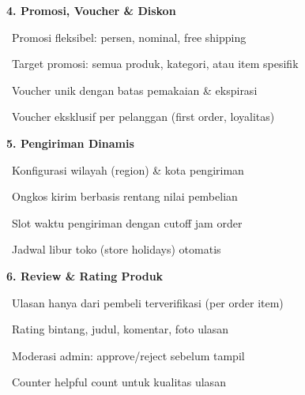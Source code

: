 \documentclass[a4paper]{article}
\begin{document}
\hfill%
\begin{minipage}[t]{0.485\textwidth}

    {\fontsize{10.5}{13}\selectfont\bfseries\color{EmeraldPrimary} 4. Promosi, Voucher \& Diskon}
    \vspace{3pt}

    {\fontsize{9}{13}\selectfont\color{TextDark}%
    \textbullet\ Promosi fleksibel: persen, nominal, free shipping\par\vspace{2pt}%
    \textbullet\ Target promosi: semua produk, kategori, atau item spesifik\par\vspace{2pt}%
    \textbullet\ Voucher unik dengan batas pemakaian \& ekspirasi\par\vspace{2pt}%
    \textbullet\ Voucher eksklusif per pelanggan (first order, loyalitas)}%
    \vspace{8pt}

    {\fontsize{10.5}{13}\selectfont\bfseries\color{EmeraldPrimary} 5. Pengiriman Dinamis}
    \vspace{3pt}

    {\fontsize{9}{13}\selectfont\color{TextDark}%
    \textbullet\ Konfigurasi wilayah (region) \& kota pengiriman\par\vspace{2pt}%
    \textbullet\ Ongkos kirim berbasis rentang nilai pembelian\par\vspace{2pt}%
    \textbullet\ Slot waktu pengiriman dengan cutoff jam order\par\vspace{2pt}%
    \textbullet\ Jadwal libur toko (store holidays) otomatis}%
    \vspace{8pt}

    {\fontsize{10.5}{13}\selectfont\bfseries\color{EmeraldPrimary} 6. Review \& Rating Produk}
    \vspace{3pt}

    {\fontsize{9}{13}\selectfont\color{TextDark}%
    \textbullet\ Ulasan hanya dari pembeli terverifikasi (per order item)\par\vspace{2pt}%
    \textbullet\ Rating bintang, judul, komentar, foto ulasan\par\vspace{2pt}%
    \textbullet\ Moderasi admin: approve/reject sebelum tampil\par\vspace{2pt}%
    \textbullet\ Counter helpful count untuk kualitas ulasan}%

\end{minipage}
\end{document}

